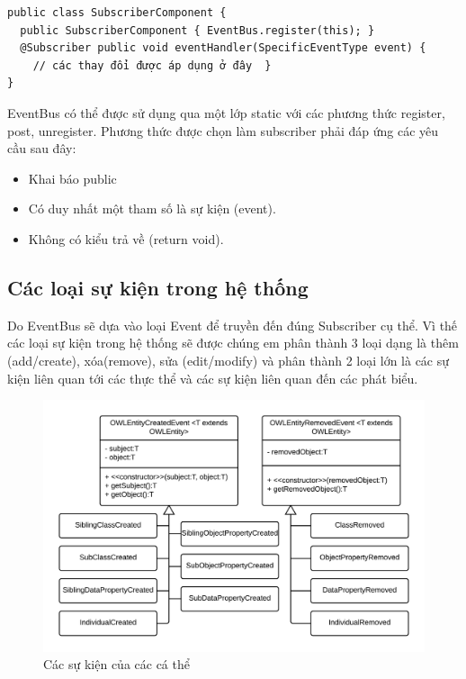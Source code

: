 {\begin{verbatim}
public class SubscriberComponent {
  public SubscriberComponent { EventBus.register(this); }
  @Subscriber public void eventHandler(SpecificEventType event) { 
  	// các thay đổi được áp dụng ở đây  }
}
\end{verbatim}
EventBus có thể được sử dụng qua một lớp static với các phương thức register, post, unregister. Phương thức được chọn làm subscriber phải đáp ứng các yêu cầu sau đây:
\begin{itemize}
\item Khai báo public
\item Có duy nhất một tham số là sự kiện (event).
\item Không có kiểu trả về (return void).
\end{itemize}
\subsection{Các loại sự kiện trong hệ thống}
Do EventBus sẽ dựa vào loại Event để truyền đến đúng Subscriber cụ thể. Vì thế các loại sự kiện trong hệ thống sẽ được chúng em phân thành 3 loại dạng là thêm (add/create), xóa(remove), sửa (edit/modify) và phân thành 2 loại lớn là các sự kiện liên quan tới các thực thể và các sự kiện liên quan đến các phát biểu.
\begin{figure}[h!]
	\centering
	\includegraphics[width=150mm]{Figures/uml_entity_event.png}
	\caption{Các sự kiện của các cá thể\label{overflow}}
\end{figure}
\begin{figure}[h!]
	\centering

\end{figure}}
